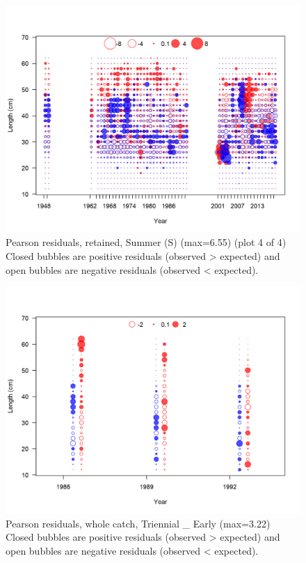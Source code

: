 \documentclass[12pt,]{article}
\begin{document}
\begin{figure}
\centering
\includegraphics{r4ss/plots_mod1/comp_lenfit_residsflt4mkt2_page4.png}
\caption{Pearson residuals, retained, Summer (S) (max=6.55) (plot 4 of
4)\\
Closed bubbles are positive residuals (observed \textgreater{} expected)
and open bubbles are negative residuals (observed \textless{} expected).
\label{fig:ss_len_pearson}}
\end{figure}

\begin{figure}
\centering
\includegraphics{r4ss/plots_mod1/comp_lenfit_residsflt5mkt0.png}
\caption{Pearson residuals, whole catch, Triennial \_ Early (max=3.22)\\
Closed bubbles are positive residuals (observed \textgreater{} expected)
and open bubbles are negative residuals (observed \textless{} expected).
\label{fig:tri_early_len_pearson}}
\end{figure}
\end{document}
